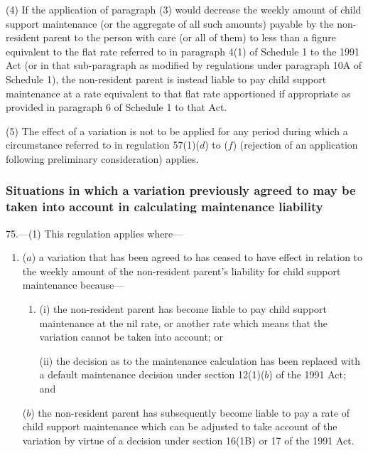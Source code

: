 \documentclass[12pt,a4paper]{article}
\begin{document}
\begin{sloppypar}
(4) If the application of paragraph (3) would decrease the weekly amount of child support maintenance (or the aggregate of all such amounts) payable by the non-resident parent to the person with care (or all of them) to less than a figure equivalent to the flat rate referred to in paragraph 4(1) of Schedule 1 to the 1991 Act (or in that sub-paragraph as modified by regulations under paragraph 10A of Schedule 1), the non-resident parent is instead liable to pay child support maintenance at a rate equivalent to that flat rate apportioned if appropriate as provided in paragraph 6 of Schedule 1 to that Act.
\end{sloppypar}

(5) The effect of a variation is not to be applied for any period during which a circumstance referred to in regulation 57(1)($d$)  to ($f$)  (rejection of an application following preliminary consideration) applies.


\subsubsection[75. Situations in which a variation previously agreed to may be taken into account in calculating maintenance liability]{Situations in which a variation previously agreed to may be taken into account in calculating maintenance liability}

75.---(1)  This regulation applies where—
\begin{enumerate}\item[]
($a$) a variation that has been agreed to has ceased to have effect in relation to the weekly amount of the non-resident parent’s liability for child support maintenance because—
\begin{enumerate}\item[]
(i) the non-resident parent has become liable to pay child support maintenance at the nil rate, or another rate which means that the variation cannot be taken into account; or

(ii) the decision as to the maintenance calculation has been replaced with a default maintenance decision under section 12(1)($b$)  of the 1991 Act; and
\end{enumerate}

($b$) the non-resident parent has subsequently become liable to pay a rate of child support maintenance which can be adjusted to take account of the variation by virtue of a decision under section 16(1B) or 17 of the 1991 Act.
\end{enumerate}
\end{document}
